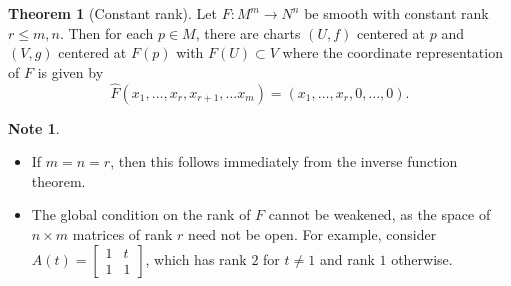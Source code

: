 \documentclass[10pt,letterpaper,cm]{nupset}
\theoremstyle{definition}
\newtheorem{note}[definition]{Note}
\theoremstyle{theorem}
\newtheorem{theorem}[definition]{Theorem}
\theoremstyle{remark}
\newcommand{\1}{\mathbf{1}}
\newcommand{\0}{\vec 0}
\begin{document}
\begin{theorem}[Constant rank]
Let $F: M^m \to N^n$ be smooth with constant rank $r\leq m, n$. Then for each $p\in M$, there are charts $(U, f)$ centered at $p$ and $(V, g)$ centered at $F(p)$ with $F(U) \subset V$ where the coordinate representation of $F$ is given by $$\widehat{F}(x_1, \ldots, x_r, x_{r+1}, \ldots x_m) = (x_1, \ldots, x_r, 0,\ldots, 0).$$
\begin{note} $ $
\begin{itemize}
\item If $m=n =r$, then this follows immediately from the inverse function theorem. 
\item The global condition on the rank of $F$ cannot be weakened, as the space of $n\times m$ matrices of rank $r$ need not be open. For example, consider $A(t) = \begin{bmatrix} 1 & t \\ 1 & 1 \end{bmatrix}$, which has rank $2$ for $t\ne 1$ and rank $1$ otherwise.
\end{itemize}
\end{note}
\end{theorem}
\end{document}
